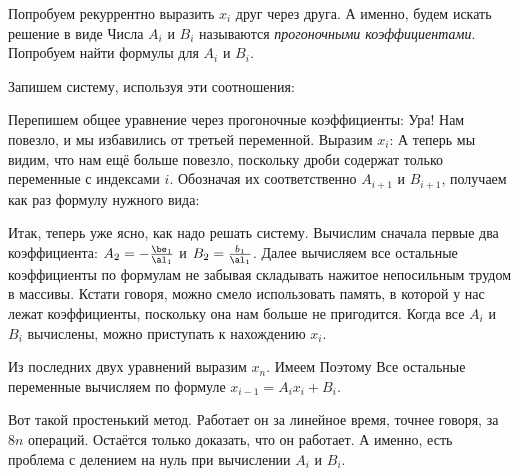 \documentclass[a4paper]{article}
\begin{document}
Попробуем рекуррентно выразить $x_i$ друг через друга. А именно, будем
искать решение в виде   Числа $A_i$ и
$B_i$ называются \emph{прогоночными коэффициентами}.  Попробуем найти
формулы для $A_i$ и $B_i$.

Запишем систему, используя эти соотношения: 

Перепишем общее уравнение через прогоночные коэффициенты:   Ура! Нам
повезло, и мы избавились от третьей переменной. Выразим $x_i$:
  А теперь
мы видим, что нам ещё больше повезло, поскольку дроби содержат только
переменные с индексами $i$.  Обозначая их соответственно $A_{i+1}$ и
$B_{i+1}$, получаем как раз формулу нужного вида: 

Итак, теперь уже ясно, как надо решать систему. Вычислим сначала
первые два коэффициента: $A_2 = -\frac{\be_1}{\al_1}$ и $B_2 =
\frac{b_1}{\al_1}$.  Далее вычисляем все остальные коэффициенты по
формулам  не забывая
складывать нажитое непосильным трудом в массивы. Кстати говоря, можно
смело использовать память, в которой у нас лежат коэффициенты,
поскольку она нам больше не пригодится.  Когда все $A_i$ и $B_i$
вычислены, можно приступать к нахождению $x_i$.

Из последних двух уравнений выразим $x_n$. Имеем   Поэтому   Все
остальные переменные вычисляем по формуле $x_{i-1} = A_i x_i + B_i$.

Вот такой простенький метод. Работает он за линейное время, точнее
говоря, за $8n$ операций.  Остаётся только доказать, что он
работает. А именно, есть проблема с делением на нуль при вычислении
$A_i$ и $B_i$.
\end{document}
